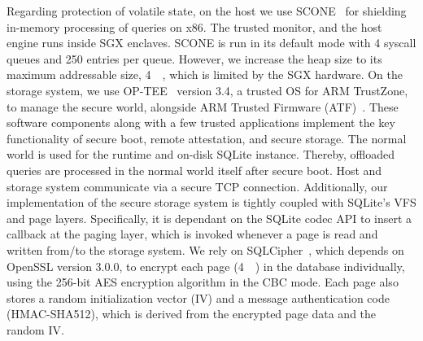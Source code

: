 Regarding protection of volatile state, on the host we use SCONE~\cite{arnautov2016} %
for shielding in-memory processing of queries on x86. The trusted monitor, and the host engine runs inside SGX enclaves. SCONE is run in its default mode with 4 syscall queues and 250 entries per queue. However, we increase the heap size to its maximum addressable size, \SI{4}{\gibi\byte}, which is limited by the SGX hardware. %
On the storage system, %
we use OP-TEE~\cite{optee} version 3.4, a trusted OS for ARM TrustZone, to manage the secure world, alongside ARM Trusted Firmware (ATF)~\cite{atf}. These software components along with a few trusted applications implement the key functionality of secure boot, remote attestation, and secure storage. The normal world is used for the \csd runtime and on-disk SQLite instance. Thereby, offloaded queries are processed in the normal world itself after secure boot. Host and storage system communicate via a secure TCP connection.
Additionally, our implementation of the secure storage system is tightly coupled with SQLite's VFS and page layers. Specifically, it is dependant on the SQLite codec API to insert a callback at the paging layer, which is invoked whenever a page is read and written from/to the storage system. %
%
We rely on SQLCipher~\cite{sqlcipher}, which depends on OpenSSL version 3.0.0, to encrypt each page (\SI{4}{\kibi\byte}) in the database individually, using the 256-bit AES encryption algorithm in the CBC mode. Each page also stores a random initialization vector (IV) and a message authentication code (HMAC-SHA512), which is derived from the encrypted page data and the random IV. %
